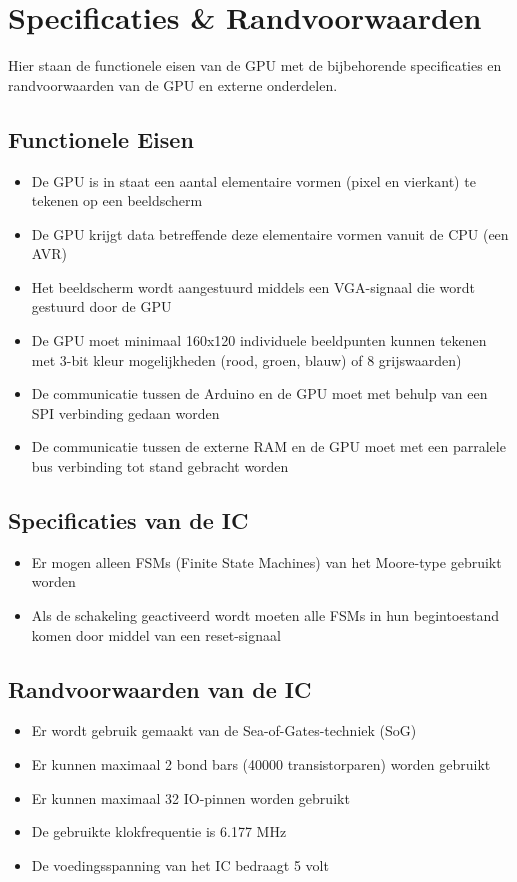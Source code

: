 \documentclass{scrreprt} %
\date{22 november 2013}
\begin{document}
\chapter{Specificaties & Randvoorwaarden}
Hier staan de functionele eisen van de GPU met de bijbehorende specificaties en randvoorwaarden van de GPU en externe onderdelen.
\section {Functionele Eisen}
\begin {itemize}
\item De GPU is in staat een aantal elementaire vormen (pixel en vierkant) te tekenen op een beeldscherm
\item De GPU krijgt data betreffende deze elementaire vormen vanuit de CPU (een AVR)
\item Het beeldscherm wordt aangestuurd middels een VGA-signaal die wordt gestuurd door de GPU
\item De GPU moet minimaal 160x120 individuele beeldpunten kunnen tekenen met 3-bit kleur mogelijkheden (rood, groen, blauw) of 8 grijswaarden)
\item De communicatie tussen de Arduino en de GPU moet met behulp van een SPI verbinding gedaan worden
\item De communicatie tussen de externe RAM en de GPU moet met een parralele bus verbinding tot stand gebracht worden

\end{itemize}

\section {Specificaties van de IC}
\begin {itemize}
\item Er mogen alleen FSMs (Finite State Machines) van het Moore-type gebruikt worden
\item Als de schakeling geactiveerd wordt moeten alle FSMs in hun begintoestand komen door middel van een reset-signaal

\end{itemize}

\section {Randvoorwaarden van de IC}
\begin {itemize}
\item Er wordt gebruik gemaakt van de Sea-of-Gates-techniek (SoG)
\item Er kunnen maximaal 2 bond bars (40000 transistorparen) worden gebruikt
\item Er kunnen maximaal 32 IO-pinnen worden gebruikt
\item De gebruikte klokfrequentie is 6.177 MHz
\item De voedingsspanning van het IC bedraagt 5 volt
\end {itemize}
\end{document}
